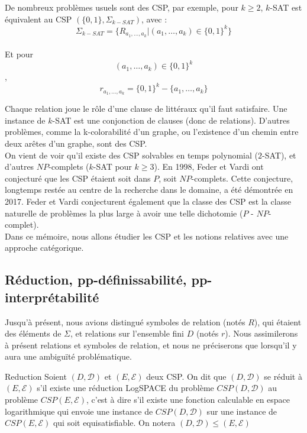 De nombreux problèmes usuels sont des CSP, par exemple, pour $k \geq 2$,
$k$-SAT est équivalent au CSP $(\{0,1\},\Sigma_{k-SAT})$, avec :\\

$$\Sigma_{k-SAT} = \{R_{a_1,\dots,a_k}|(a_1,\dots,a_k) \in \{0,1\}^k\}$$\\ Et
pour $$(a_1,\dots,a_k) \in \{0,1\}^k$$, $$r_{a_1,\dots,a_k} = \{0,1\}^k -
\{a_1,\dots,a_k\} $$

Chaque relation joue le rôle d'une clause de littéraux qu'il faut satisfaire.
Une instance de $k$-SAT est une conjonction de clauses (donc de relations).
D'autres problèmes, comme la k-colorabilité d'un graphe, ou l'existence d'un
chemin entre deux arêtes d'un graphe, sont des CSP.\\

On vient de voir qu'il existe des CSP solvables en temps polynomial ($2$-SAT),
et d'autres $NP$-complets ($k$-SAT pour $k \geq 3$). En 1998, Feder et Vardi
ont conjecturé que les CSP étaient soit dans $P$, soit $NP$-complets. Cette
conjecture, longtemps restée au centre de la recherche dans le domaine, a été
démontrée en 2017. Feder et Vardi conjecturent également que la classe des CSP
est la classe naturelle de problèmes la plus large à avoir une telle dichotomie
($P$ - $NP$-complet).\\ Dans ce mémoire, nous allons étudier les CSP et les
notions relatives avec une approche catégorique.\\

\subsection{Réduction, pp-définissabilité, pp-interprétabilité}

Jusqu'à présent, nous avions distingué symboles de relation (notés $R$), qui
étaient des éléments de $\Sigma$, et relations sur l'ensemble fini $D$ (notés
$r$). Nous assimilerons à présent relations et symboles de relation, et nous ne
préciserons que lorsqu'il y aura une ambiguïté problématique.

\begin{defi}{Reduction}
    Soient $(D,\mathcal{D})$ et $(E,\mathcal{E})$ deux CSP. On dit que
    $(D,\mathcal{D})$ se réduit à  $(E,\mathcal{E})$ s'il existe une réduction
    LogSPACE du problème $CSP(D,\mathcal{D})$ au problème $CSP(E,\mathcal{E})$,
    c'est à dire s'il existe une fonction calculable en espace logarithmique
    qui envoie une instance de $CSP(D,\mathcal{D})$ sur une instance de
    $CSP(E,\mathcal{E})$ qui soit equisatisfiable. On notera $(D,\mathcal{D})
    \leq (E,\mathcal{E})$
\end{defi}

